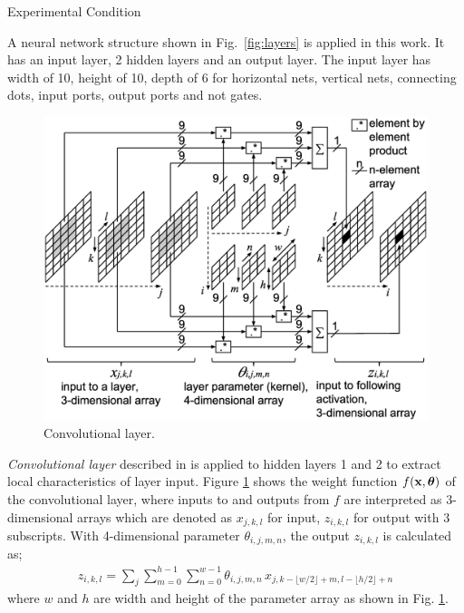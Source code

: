 \documentclass[twocolumn]{article}
\makeatletter
\def\section{\@startsection {section}{1}{\z@}{20pt plus 2pt minus 2pt}
{8pt plus 2pt minus 2pt}{\centering\normalsize\sc
\edef\@svsec{\thesection.\ }}}
\def\thesection{\Roman{section}}
\makeatother
\begin{document}
\section{Experimental Condition}

A neural network structure shown in Fig.\ \ref{fig:layers} is
applied in this work.
It has an input layer, 2 hidden layers and an output layer.
The input layer has width of 10, height of 10,
depth of 6 for horizontal nets, vertical nets, connecting dots, input ports,
output ports and not gates.

\begin{figure}[!tb]
 \begin{center}
  \begin{minipage}{\hsize}
   \includegraphics[width=\hsize]{fig/layer_convolutional_03.eps}
   \caption{Convolutional layer.}
   \label{fig:layer_convolutional}
  \end{minipage}
 \end{center}
\end{figure}

{\it Convolutional layer} described in \cite{mit} is applied
to hidden layers 1 and 2
to extract local characteristics of layer input.
Figure \ref{fig:layer_convolutional} shows the weight function
$f({\bf x}, {\bm \theta})$ of the convolutional layer,
where inputs to and outputs from $f$ are interpreted as
3-dimensional arrays which are denoted as $x_{j,k,l}$ for input,
$z_{i,k,l}$ for output with 3 subscripts.
With 4-dimensional parameter $\theta_{i,j,m,n}$,
the output $z_{i,k,l}$ is calculated as;
\begin{eqnarray}
z_{i,k,l} = \sum_{j}\sum^{h-1}_{m=0}\sum^{w-1}_{n=0}
\theta_{i,j,m,n}\,
 x_{j,k - \lfloor w/2 \rfloor + m,l - \lfloor h/2 \rfloor + n}
\end{eqnarray}
where $w$ and $h$ are width and height of the parameter array
as shown in Fig. \ref{fig:layer_convolutional}.
\end{document}
